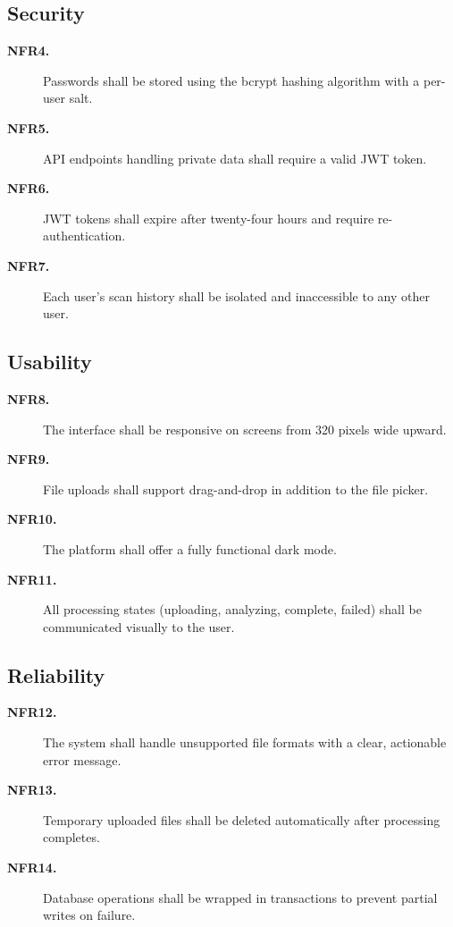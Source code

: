 \subsection*{Security}
\begin{description}
\item[\textbf{NFR4.}] Passwords shall be stored using the bcrypt hashing algorithm with a per-user salt.
\item[\textbf{NFR5.}] API endpoints handling private data shall require a valid JWT token.
\item[\textbf{NFR6.}] JWT tokens shall expire after twenty-four hours and require re-authentication.
\item[\textbf{NFR7.}] Each user's scan history shall be isolated and inaccessible to any other user.
\end{description}

\subsection*{Usability}
\begin{description}
\item[\textbf{NFR8.}] The interface shall be responsive on screens from 320 pixels wide upward.
\item[\textbf{NFR9.}] File uploads shall support drag-and-drop in addition to the file picker.
\item[\textbf{NFR10.}] The platform shall offer a fully functional dark mode.
\item[\textbf{NFR11.}] All processing states (uploading, analyzing, complete, failed) shall be communicated visually to the user.
\end{description}

\subsection*{Reliability}
\begin{description}
\item[\textbf{NFR12.}] The system shall handle unsupported file formats with a clear, actionable error message.
\item[\textbf{NFR13.}] Temporary uploaded files shall be deleted automatically after processing completes.
\item[\textbf{NFR14.}] Database operations shall be wrapped in transactions to prevent partial writes on failure.
\end{description}


